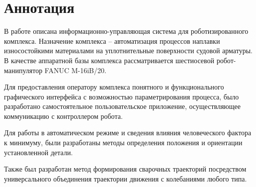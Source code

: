 \chapter{Аннотация}
В работе описана информационно-управляющая система для роботизированного комплекса.
Назначение комплекса -- автоматизация процессов наплавки износостойкими материалами на уплотнительные поверхности судовой арматуры.
В качестве аппаратной базы комплекса рассматривается шестиосевой робот-манипулятор FANUC M-16iB/20.

Для предоставления оператору комплекса понятного и функционального графического интерфейса с возможностью параметрирования процесса, было разработано самостоятельное пользовательское приложение, осуществляющее коммуникацию с контроллером робота.

Для работы в автоматическом режиме и сведения влияния человеческого фактора к минимуму, были разработаны методы определения положения и ориентации установленной детали.

Также был разработан метод формирования сварочных траекторий посредством универсального объединения траектории движения с колебаниями любого типа.
